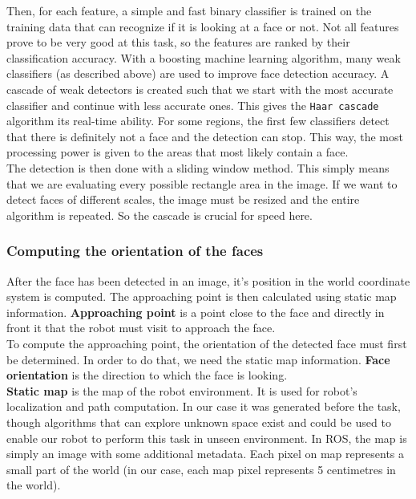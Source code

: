 \documentclass[12pt,a4paper]{article}
\begin{document}
	Then, for each feature, a simple and fast binary classifier is trained on the training data that can recognize if it is looking at a face or not. Not all features prove to be very good at this task, so the features are ranked by their classification accuracy. With a boosting machine learning algorithm, many weak classifiers (as described above) are used to improve face detection accuracy. A cascade of weak detectors is created such that we start with the most accurate classifier and continue with less accurate ones. This gives the \texttt{Haar cascade} algorithm its real-time ability. For some regions, the first few classifiers detect that there is definitely not a face and the detection can stop. This way, the most processing power is given to the areas that most likely contain a face. \\
	
	The detection is then done with a sliding window method. This simply means that we are evaluating every possible rectangle area in the image. If we want to detect faces of different scales, the image must be resized and the entire algorithm is repeated. So the cascade is crucial for speed here. \\
	
	\subsubsection{Computing the orientation of the faces} \label{face_orientation_computation}
	After the face has been detected in an image, it's position in the world coordinate system is computed. The approaching point is then calculated using static map information. \textbf{Approaching point} is a point close to the face and directly in front it that the robot must visit to approach the face. \\
	
	To compute the approaching point, the orientation of the detected face must first be determined. In order to do that, we need the static map information. \textbf{Face orientation} is the direction to which the face is looking. \\
	
	\textbf{Static map} is the map of the robot environment. It is used for robot's localization and path computation. In our case it was generated before the task, though algorithms that can explore unknown space exist and could be used to enable our robot to perform this task in unseen environment. In ROS, the map is simply an image with some additional metadata. Each pixel on map represents a small part of the world (in our case, each map pixel represents 5 centimetres in the world).\\
	
\end{document}
